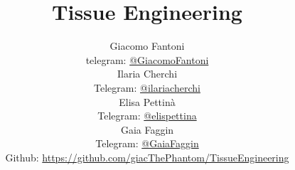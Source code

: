 
\title{\Huge\textbf{Tissue Engineering}}
\author{
  Giacomo Fantoni \\
  \small telegram: \href{https://t.me/GiacomoFantoni}{@GiacomoFantoni} \\[3pt]
  Ilaria Cherchi\\
  \small Telegram: \href{https://t.me/ilariacherchi}{@ilariacherchi} \\[3pt]
  Elisa Pettin\`a\\
  \small Telegram: \href{https://t.me/elisapettina}{@elispettina} \\[3pt]
  Gaia Faggin\\
  \small Telegram: \href{https://t.me/GaiaFaggin}{@GaiaFaggin} \\[3pt]
\small Github: \href{https://github.com/giacThePhantom/TissueEngineering}{https://github.com/giacThePhantom/TissueEngineering}}


\maketitle
\tableofcontents

    
    
    
    
    
    
    
    
    
    


